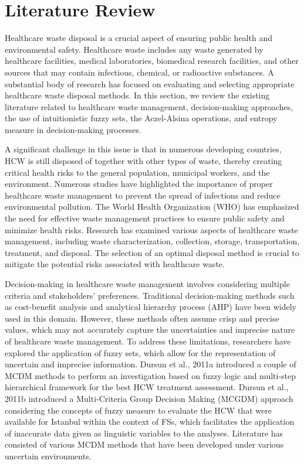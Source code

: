 \chapter{Literature Review}


\label{sec:start}
\begin{flushleft}
    

Healthcare waste disposal is a crucial aspect of ensuring public health and environmental safety. Healthcare waste includes any waste generated by healthcare facilities, medical laboratories, biomedical research facilities, and other sources that may contain infectious, chemical, or radioactive substances. A substantial body of research has focused on evaluating and selecting appropriate healthcare waste disposal methods. In this section, we review the existing literature related to healthcare waste management, decision-making approaches, the use of intuitionistic fuzzy sets, the Aczel-Alsina operations, and entropy measure in decision-making processes.

\vspace{5mm}

A significant challenge in this issue is that in numerous developing
countries, HCW is still disposed of together with other types
of waste, thereby creating critical health risks to the general population,
municipal workers, and the environment.
Numerous studies have highlighted the importance of proper healthcare waste management to prevent the spread of infections and reduce environmental pollution. The World Health Organization (WHO) has emphasized the need for effective waste management practices to ensure public safety and minimize health risks. Research has examined various aspects of healthcare waste management, including waste characterization, collection, storage, transportation, treatment, and disposal. The selection of an optimal disposal method is crucial to mitigate the potential risks associated with healthcare waste.

\vspace{5mm}

Decision-making in healthcare waste management involves considering multiple criteria and stakeholders' preferences. Traditional decision-making methods such as cost-benefit analysis and analytical hierarchy process (AHP) have been widely used in this domain. However, these methods often assume crisp and precise values, which may not accurately capture the uncertainties and imprecise nature of healthcare waste management. To address these limitations, researchers have explored the application of fuzzy sets, which allow for the representation of uncertain and imprecise information. Dursun et al., 2011a \cite{4} introduced a couple of
MCDM methods to perform an investigation based on fuzzy logic
and multi-step hierarchical framework for the best HCW treatment
assessment. Dursun et al., 2011b \cite{3} introduced a Multi-Criteria
Group Decision Making (MCGDM) approach considering the concepts
of fuzzy measure to evaluate the HCW that were available for
Istanbul within the context of FSs, which facilitates the application
of inaccurate data given as linguistic variables to the analyses.
Literature has consisted of various MCDM methods that have
been developed under various uncertain environments.


\end{flushleft}
